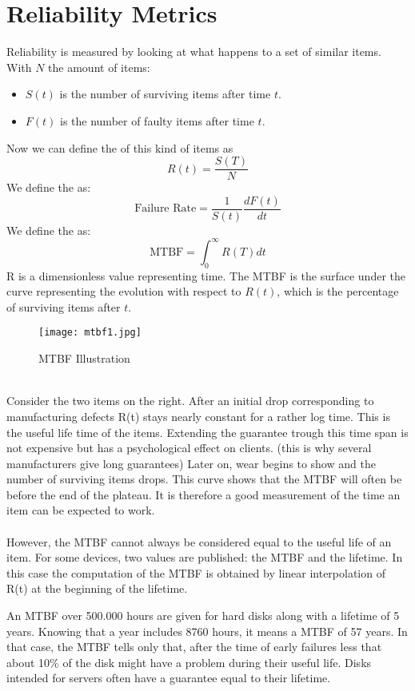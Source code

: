 \documentclass[../main.tex]{subfiles}
\begin{document}
\section{Reliability Metrics}
Reliability is measured by looking at what happens to a set of similar items. With $N$ the amount of items:
\begin{itemize}
	\item $S(t)$ is the number of surviving items after time $t$.
	\item $F(t)$ is the number of faulty items after time $t$.
\end{itemize}
Now we can define the  of this kind of items as 
\[
R(t) = \frac{S(T)}{N}
\]
We define the  as:
\[
\text{Failure Rate} = \frac{1}{S(t)} \frac{dF(t)}{dt}
\]
We define the  as:
\[
\text{MTBF} = \int_0^{\infty} R(T) dt
\]
R is a dimensionless value representing time. The MTBF is the surface under the curve representing the evolution with respect to $R(t)$, which is the percentage of surviving items after $t$.
\begin{figure}[h!]
    \centering
    \texttt{[image: mtbf1.jpg]}
    \caption{MTBF Illustration}
    \label{mtbf1}
\end{figure}
\\
Consider the two items on the right. After an initial drop corresponding to manufacturing defects R(t) stays nearly constant for a rather log time. This is the useful life time of the items. Extending the guarantee trough this time span is not expensive but has a psychological effect on clients. (this is why several manufacturers give long guarantees)
Later on, wear begins to show and the number of surviving items drops. This curve shows that the MTBF will often be before the end of the plateau. It is therefore a good measurement of the time an item can be expected to work.
\\\\
However, the MTBF cannot always be considered equal to the useful life of an item. For some devices, two values are published: the MTBF and the lifetime. In this case the computation of the MTBF is obtained by linear interpolation of R(t) at the beginning of the lifetime.

\begin{exmp}
An MTBF over 500.000 hours are given for hard disks along with a lifetime of 5 years. Knowing that a year includes 8760 hours, it means a MTBF of 57 years. In that case, the MTBF tells only that, after the time of early failures less that about 10\% of the disk might have a problem during their useful life. Disks intended for servers often have a guarantee equal to their lifetime.
\end{exmp}
\end{document}
